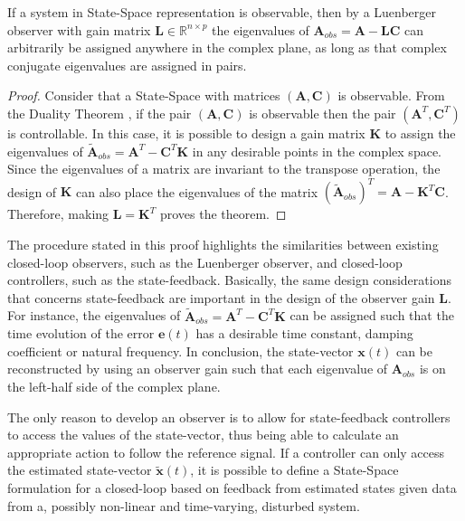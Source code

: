 \documentclass[a4paper,11pt]{book}
\numberwithin{figure}{chapter}
\numberwithin{equation}{chapter}
\numberwithin{table}{chapter}
\newtheorem{theorem}{Theorem}[chapter]
\theoremstyle{definition}
\newcounter{boxed-theorem}
\newenvironment{boxed-theorem}[1]
{\colorlet{shadecolor}{pastelBlue2!5} \begin{shaded} \begin{theorem}{#1}}
{\end{theorem} \end{shaded}}
\newcounter{boxed-lemma}
\newcounter{boxed-definition}
\newcounter{boxed-example}
\begin{document}
\begin{boxed-theorem}
    If a system in State-Space representation is observable, then by a Luenberger observer with gain matrix $\bm{L} \in \mathbb{R}^{n \times p}$ the eigenvalues of $\bm{A}_{obs} = \bm{A} - \bm{L} \bm{C}$ can arbitrarily be assigned anywhere in the complex plane, as long as that complex conjugate eigenvalues are assigned in pairs.
\end{boxed-theorem} 

\begin{proof}
    Consider that a State-Space with matrices $(\bm{A}, \bm{C})$ is observable. From the Duality Theorem \cite{Chen:1998}, if the pair $(\bm{A}, \bm{C})$ is observable then the pair $(\bm{A}^T, \bm{C}^T)$ is controllable. In this case, it is possible to design a gain matrix $\bm{K}$ to assign the eigenvalues of $\tilde{\bm{A}}_{obs} = \bm{A}^T - \bm{C}^T \bm{K}$ in any desirable points in the complex space. Since the eigenvalues of a matrix are invariant to the transpose operation, the design of $\bm{K}$ can also place the eigenvalues of the matrix $(\tilde{\bm{A}}_{obs})^T = \bm{A} - \bm{K}^T \bm{C}$. Therefore, making $\bm{L} = \bm{K}^T$ proves the theorem.
\end{proof}

The procedure stated in this proof highlights the similarities between existing closed-loop observers, such as the Luenberger observer, and closed-loop controllers, such as the state-feedback. Basically, the same design considerations that concerns state-feedback are important in the design of the observer gain $\bm{L}$. For instance, the eigenvalues of $\tilde{\bm{A}}_{obs} = \bm{A}^T - \bm{C}^T \bm{K}$ can be assigned such that the time evolution of the error $\bm{e}(t)$ has a desirable time constant, damping coefficient or natural frequency. In conclusion, the state-vector $\bm{x}(t)$ can be reconstructed by using an observer gain such that each eigenvalue of $\bm{A}_{obs}$ is on the left-half side of the complex plane. 

The only reason to develop an observer is to allow for state-feedback controllers to access the values of the state-vector, thus being able to calculate an appropriate action to follow the reference signal. If a controller can only access the estimated state-vector $\tilde{\bm{x}}(t)$, it is possible to define a State-Space formulation for a closed-loop based on feedback from estimated states given data from a, possibly non-linear and time-varying, disturbed system.
\end{document}
